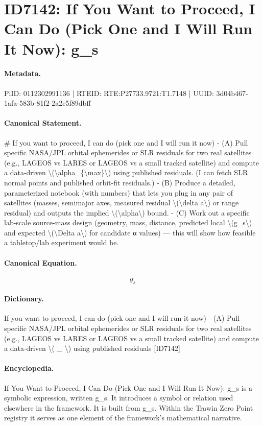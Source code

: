 \section*{ID7142: If You Want to Proceed, I Can Do (Pick One and I Will Run It Now): g\_s}
\paragraph{Metadata.}
PiID: 0112302991136 | RTEID: RTE:P27733.9721:T1.7148 | UUID: 3d04b467-1afa-583b-81f2-2a2e5f89dbff

\paragraph{Canonical Statement.}
\# If you want to proceed, I can do (pick one and I will run it now) - (A) Pull specific NASA/JPL orbital ephemerides or SLR residuals for two real satellites (e.g., LAGEOS vs LARES or LAGEOS vs a small tracked satellite) and compute a data-driven \textbackslash{}(\textbackslash{}alpha\_\{\textbackslash{}max\}\textbackslash{}) using published residuals. (I can fetch SLR normal points and published orbit-fit residuals.) - (B) Produce a detailed, parameterized notebook (with numbers) that lets you plug in any pair of satellites (masses, semimajor axes, measured residual \textbackslash{}(\textbackslash{}delta a\textbackslash{}) or range residual) and outputs the implied \textbackslash{}(\textbackslash{}alpha\textbackslash{}) bound. - (C) Work out a specific lab-scale source-mass design (geometry, mass, distance, predicted local \textbackslash{}(g\_s\textbackslash{}) and expected \textbackslash{}(\textbackslash{}Delta a\textbackslash{}) for candidate α values) — this will show how feasible a tabletop/lab experiment would be.

\paragraph{Canonical Equation.}
\[
g_s
\]

\paragraph{Dictionary.}
If you want to proceed, I can do (pick one and I will run it now) - (A) Pull specific NASA/JPL orbital ephemerides or SLR residuals for two real satellites (e.g., LAGEOS vs LARES or LAGEOS vs a small tracked satellite) and compute a data-driven \textbackslash{}( \_ \textbackslash{}) using published residuals [ID7142]

\paragraph{Encyclopedia.}
If You Want to Proceed, I Can Do (Pick One and I Will Run It Now): g\_s is a symbolic expression, written g\_s. It introduces a symbol or relation used elsewhere in the framework. It is built from g\_s. Within the Trawin Zero Point registry it serves as one element of the framework's mathematical narrative.
